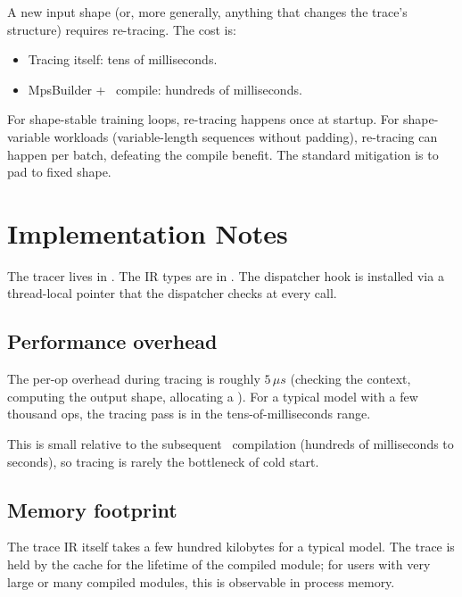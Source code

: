 A new input shape (or, more generally, anything that changes the
trace's structure) requires re-tracing. The cost is:

\begin{itemize}
  \item Tracing itself: tens of milliseconds.
  \item MpsBuilder + \MPSGraph\ compile: hundreds of
    milliseconds.
\end{itemize}

For shape-stable training loops, re-tracing happens once at
startup. For shape-variable workloads (variable-length sequences
without padding), re-tracing can happen per batch, defeating
the compile benefit. The standard mitigation is to pad to fixed
shape.

\section{Implementation Notes}
\label{sec:tracer:impl_notes}

The tracer lives in .
The IR types are in . The dispatcher hook is
installed via a thread-local  pointer that
the dispatcher checks at every call.

\subsection{Performance overhead}
\label{ssec:tracer:perf_overhead}

The per-op overhead during tracing is roughly $5\,\mu s$
(checking the context, computing the output shape, allocating a
). For a typical model with a few thousand ops,
the tracing pass is in the tens-of-milliseconds range.

This is small relative to the subsequent \MPSGraph\ compilation
(hundreds of milliseconds to seconds), so tracing is rarely the
bottleneck of cold start.

\subsection{Memory footprint}
\label{ssec:tracer:mem_footprint}

The trace IR itself takes a few hundred kilobytes for a typical
model. The trace is held by the cache for the lifetime of the
compiled module; for users with very large or many compiled
modules, this is observable in process memory.

